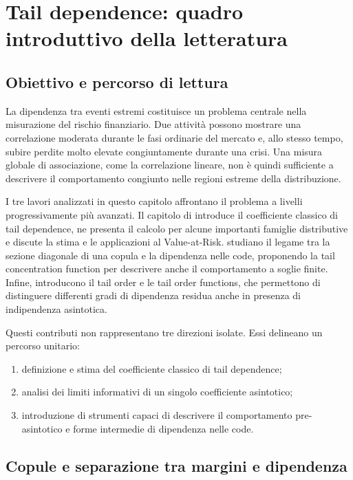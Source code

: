 \chapter[Quadro introduttivo]{Tail dependence: quadro introduttivo della letteratura}
\label{chap:quadro-letteratura}

\section{Obiettivo e percorso di lettura}

La dipendenza tra eventi estremi costituisce un problema centrale nella
misurazione del rischio finanziario. Due attività possono mostrare una
correlazione moderata durante le fasi ordinarie del mercato e, allo stesso
tempo, subire perdite molto elevate congiuntamente durante una crisi. Una
misura globale di associazione, come la correlazione lineare, non è quindi
sufficiente a descrivere il comportamento congiunto nelle regioni estreme
della distribuzione.

I tre lavori analizzati in questo capitolo affrontano il problema a livelli
progressivamente più avanzati. Il capitolo di \textcite{schmidt2005} introduce
il coefficiente classico di tail dependence, ne presenta il calcolo per alcune
importanti famiglie distributive e discute la stima e le applicazioni al
Value-at-Risk. \textcite{duranteEtAl2015} studiano il legame tra la sezione
diagonale di una copula e la dipendenza nelle code, proponendo la tail
concentration function per descrivere anche il comportamento a soglie finite.
Infine, \textcite{huaJoe2011} introducono il tail order e le tail order
functions, che permettono di distinguere differenti gradi di dipendenza
residua anche in presenza di indipendenza asintotica.

Questi contributi non rappresentano tre direzioni isolate. Essi delineano un
percorso unitario:

\begin{enumerate}
    \item definizione e stima del coefficiente classico di tail dependence;
    \item analisi dei limiti informativi di un singolo coefficiente asintotico;
    \item introduzione di strumenti capaci di descrivere il comportamento
    pre-asintotico e forme intermedie di dipendenza nelle code.
\end{enumerate}

\section{Copule e separazione tra margini e dipendenza}

